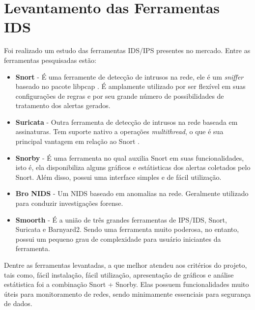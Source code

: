 	\section{Levantamento das Ferramentas IDS}
	\label{sec:IDS_Ferramentas}
	

		Foi realizado um estudo das ferramentas IDS/IPS presentes no mercado. Entre as ferramentas pesquisadas estão:

			\begin{itemize}
				\item \textbf{Snort} - É uma ferramente de detecção de intrusos na rede, ele é um \textit{sniffer} baseado no pacote libpcap \cite{Martin}. É amplamente utilizado por ser flexível em suas configurações de regras e por seu grande número de possibilidades de tratamento dos alertas gerados. 
				\item \textbf{Suricata} - Outra ferramenta de detecção de intrusos na rede baseada em assinaturas. Tem suporte nativo a operações \textit{multithread}, o que é sua principal vantagem em relação ao Snort \cite{Albin}. 
				\item \textbf{Snorby} - É uma ferramenta no qual auxilia Snort em suas funcionalidades, isto é, ela disponibiliza alguns gráficos e estátisticas dos alertas coletados pelo Snort. Além disso, possui uma interface simples e de fácil utilização. 
				\item \textbf{Bro NIDS} - Um NIDS baseado em anomalias na rede. Geralmente utilizado para conduzir investigações forense.
				\item \textbf{Smoorth} - É a união de três grandes ferramentas de IPS/IDS, Snort, Suricata e Barnyard2. Sendo uma ferramenta muito poderosa, no entanto, possui um pequeno grau de complexidade para usuário iniciantes da ferramenta.
			\end{itemize}

		
		Dentre as ferramentas levantadas, a que melhor atendeu aos critérios do projeto, tais como, fácil instalação, fácil utilização, apresentação de gráficos e análise estátistica foi a combinação Snort + Snorby. Elas possuem funcionalidades muito úteis para monitoramento de redes, sendo minimamente essenciais para segurança de dados.
